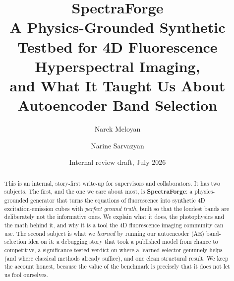 \documentclass[11pt]{article}
\title{\vspace{-1.5em}\textbf{SpectraForge}\\[0.2em]
{\large A Physics-Grounded Synthetic Testbed for 4D Fluorescence Hyperspectral Imaging,\\
and What It Taught Us About Autoencoder Band Selection}}
\author{Narek Meloyan \and Narine Sarvazyan}
\date{Internal review draft, July 2026}
\begin{document}
\maketitle
\vspace{-1em}

\begin{abstract}
\noindent This is an internal, story-first write-up for supervisors and collaborators. It
has two subjects. The first, and the one we care about most, is \textbf{SpectraForge}: a
physics-grounded generator that turns the equations of fluorescence into synthetic 4D
excitation-emission cubes with \emph{perfect ground truth}, built so that the loudest bands
are deliberately not the informative ones. We explain what it does, the photophysics and the
math behind it, and why it is a tool the 4D fluorescence imaging community can use. The second
subject is what we \emph{learned} by running our autoencoder (AE) band-selection idea on it:
a debugging story that took a published model from chance to competitive, a
significance-tested verdict on where a learned selector genuinely helps (and where classical
methods already suffice), and one clean structural result. We keep the account honest, because
the value of the benchmark is precisely that it does not let us fool ourselves.
\end{abstract}
\end{document}
